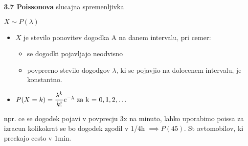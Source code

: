 \documentclass{article}
\begin{document}
\begin{multicols}{3}
\textbf{3.7 Poissonova} slucajna spremenljivka
\begin{center}
    \begin{math}
        X \sim P(\lambda)
    \end{math}
\end{center}
\begin{itemize}
    \item $X$ je stevilo ponovitev dogodka A na danem intervalu, pri cemer:
        \begin{itemize}
            \item se dogodki pojavljajo neodvisno
            \item povprecno stevilo dogodgov $\lambda$, ki se pojavjio na dolocenem intervalu, je konstantno.
        \end{itemize}
    \item \begin{math}
        P(X = k) =  \dfrac{ \lambda^{k} }{k!} e^{- \lambda}$ za k = $ 0,1,2,\dots
    \end{math}
\end{itemize}
npr. ce se dogodek pojavi v povprecju 3x na minuto, lahko uporabimo poissa za izracun
kolikokrat se bo dogodek zgodil v  1/4h $\implies P(45)$. St avtomobilov, ki preckajo cesto v 1min.

\smallskip
\end{multicols}
\end{document}

